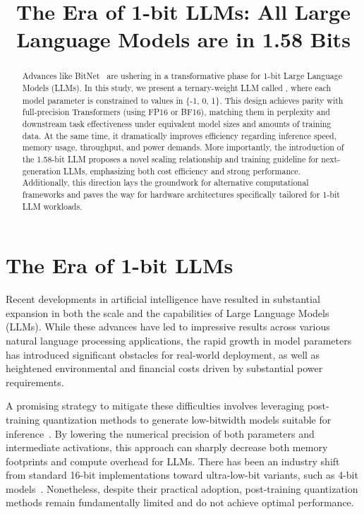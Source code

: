 \title{The Era of 1-bit LLMs: All Large Language Models are in 1.58 Bits}

\begin{abstract}
Advances like BitNet~\cite{bitnet} are ushering in a transformative phase for 1-bit Large Language Models (LLMs). In this study, we present a ternary-weight LLM called \textbf{}, where each model parameter is constrained to values in \{-1, 0, 1\}. This design achieves parity with full-precision Transformers (using FP16 or BF16), matching them in perplexity and downstream task effectiveness under equivalent model sizes and amounts of training data. At the same time, it dramatically improves efficiency regarding inference speed, memory usage, throughput, and power demands. More importantly, the introduction of the 1.58-bit LLM proposes a novel scaling relationship and training guideline for next-generation LLMs, emphasizing both cost efficiency and strong performance. Additionally, this direction lays the groundwork for alternative computational frameworks and paves the way for hardware architectures specifically tailored for 1-bit LLM workloads.
\end{abstract}

\section{The Era of 1-bit LLMs}

Recent developments in artificial intelligence have resulted in substantial expansion in both the scale and the capabilities of Large Language Models (LLMs). While these advances have led to impressive results across various natural language processing applications, the rapid growth in model parameters has introduced significant obstacles for real-world deployment, as well as heightened environmental and financial costs driven by substantial power requirements.

A promising strategy to mitigate these difficulties involves leveraging post-training quantization methods to generate low-bitwidth models suitable for inference~\cite{smoothquant, gptq, quip, quip_sharp}. By lowering the numerical precision of both parameters and intermediate activations, this approach can sharply decrease both memory footprints and compute overhead for LLMs. There has been an industry shift from standard 16-bit implementations toward ultra-low-bit variants, such as 4-bit models~\cite{gptq, awq}. Nonetheless, despite their practical adoption, post-training quantization methods remain fundamentally limited and do not achieve optimal performance.

